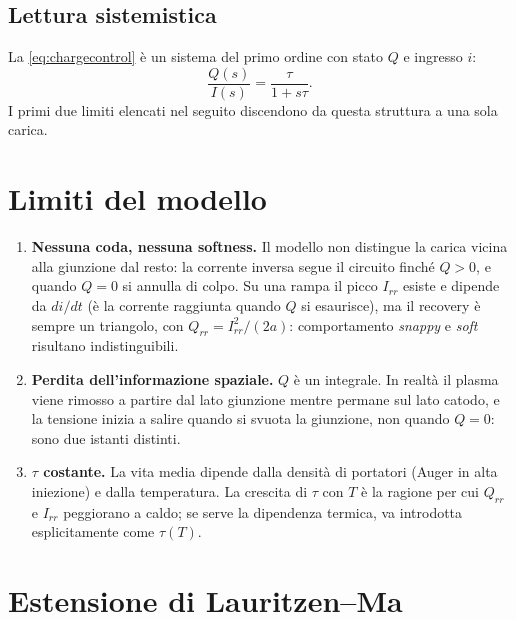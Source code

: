 \documentclass[11pt,a4paper]{article}
\begin{document}
\subsection{Lettura sistemistica}

La \eqref{eq:chargecontrol} \`e un sistema del primo ordine con stato $Q$ e ingresso $i$:
\begin{equation}
  \frac{Q(s)}{I(s)} = \frac{\tau}{1 + s\tau}.
\end{equation}
I primi due limiti elencati nel seguito discendono da questa struttura a una sola carica.

\section{Limiti del modello}

\begin{enumerate}
  \item \textbf{Nessuna coda, nessuna softness.} Il modello non distingue la carica
        vicina alla giunzione dal resto: la corrente inversa segue il circuito
        finch\'e $Q > 0$, e quando $Q = 0$ si annulla di colpo. Su una rampa il picco
        $I_{rr}$ esiste e dipende da $di/dt$ (\`e la corrente raggiunta quando $Q$ si
        esaurisce), ma il recovery \`e sempre un triangolo, con $Q_{rr} = I_{rr}^2/(2a)$:
        comportamento \emph{snappy} e \emph{soft} risultano indistinguibili.
  \item \textbf{Perdita dell'informazione spaziale.} $Q$ \`e un integrale. In realt\`a
        il plasma viene rimosso a partire dal lato giunzione mentre permane sul lato
        catodo, e la tensione inizia a salire quando si svuota la giunzione, non
        quando $Q = 0$: sono due istanti distinti.
  \item \textbf{$\tau$ costante.} La vita media dipende dalla densit\`a di portatori
        (Auger in alta iniezione) e dalla temperatura. La crescita di $\tau$ con $T$
        \`e la ragione per cui $Q_{rr}$ e $I_{rr}$ peggiorano a caldo; se serve la
        dipendenza termica, va introdotta esplicitamente come $\tau(T)$.
\end{enumerate}

\section{Estensione di Lauritzen--Ma}
\end{document}
